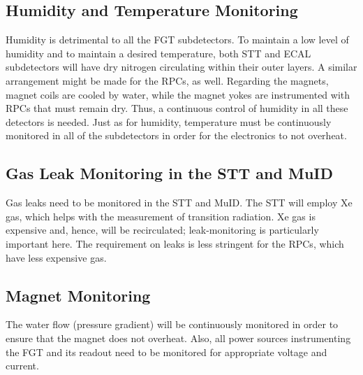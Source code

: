 \subsection{Humidity and Temperature Monitoring } %

Humidity is detrimental to all the FGT subdetectors. To maintain a low level of 
humidity and to maintain a desired temperature, both STT and ECAL subdetectors
will have dry nitrogen circulating within their outer layers. A similar arrangement 
might be made for the RPCs, as well. Regarding the magnets, magnet coils are cooled by water, 
while the magnet yokes are instrumented with RPCs that must remain dry. 
 Thus, a continuous control of 
humidity in all these detectors is needed.
Just as for humidity, temperature must be continuously monitored in all of the subdetectors
in order for the electronics to not overheat. 

\subsection{Gas Leak Monitoring in the STT and MuID}

Gas leaks need to be monitored in the STT and MuID.
The STT will employ Xe gas, which helps with the measurement of transition radiation.
Xe gas is expensive and, hence, will be recirculated; leak-monitoring is particularly important here.   
The requirement on leaks is less 
stringent for the RPCs, which have less expensive gas.

\subsection{Magnet Monitoring}

The water flow (pressure gradient) will be continuously monitored in order to ensure 
that the magnet does not overheat.  %
Also, all power sources instrumenting the FGT and its readout need to be monitored for 
appropriate voltage and current.








